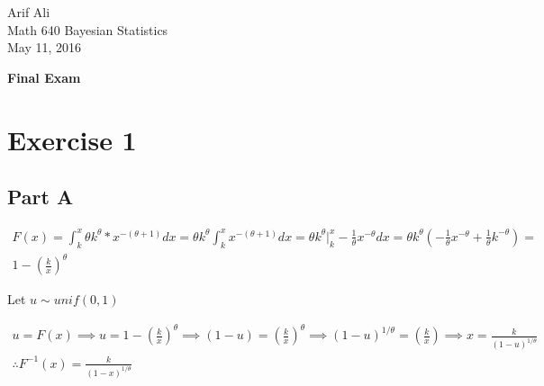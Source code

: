 \documentclass{article}\usepackage[]{graphicx}\usepackage[]{color}
\begin{document}
\begin{flushright}
Arif Ali\\
Math 640 Bayesian Statistics\\
May 11, 2016\\
\end{flushright}

\begin{center}
\LARGE\textbf{Final Exam}
  \end{center}
\section*{Exercise 1}
\subsection*{Part A}
\begin{equation}
\begin{split}
F(x)=\int_{k}^{x}\theta k^{\theta}*x^{-(\theta+1)}dx=\theta k^{\theta}\int_{k}^{x}x^{-(\theta+1)}dx=\theta k^{\theta}\big|_{k}^{x}-\frac{1}{\theta}x^{-\theta}dx=\theta k^{\theta}\left(-\frac{1}{\theta}x^{-\theta}+\frac{1}{\theta}k^{-\theta}\right)= \\
1-\left(\frac{k}{x}\right)^{\theta}
\end{split}
\end{equation} 


Let $u\sim unif(0,1)$

\begin{equation}
\begin{split}
u = F(x)\implies u = 1-\left(\frac{k}{x}\right)^{\theta}\implies (1-u) = \left(\frac{k}{x}\right)^{\theta}\implies(1-u)^{1/\theta} = \left(\frac{k}{x}\right) \implies x = \frac{k}{(1-u)^{1/\theta}}\\
\therefore F^{-1}(x) = \frac{k}{(1-x)^{1/\theta}}
\end{split}
\end{equation} 
\end{document}
